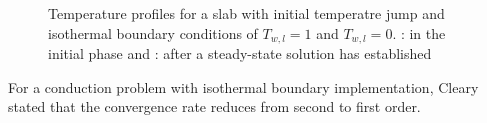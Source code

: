 \documentclass[11pt,a4paper,twoside]{report}
\begin{document}


\begin{figure}[!htbp]
\centering
\label{fig:PureHeat_Isothermal}

\caption[Temperature profiles for slab with isothermal edges]{Temperature profiles for a slab with initial temperatre jump and isothermal boundary conditions of $T_{w,l}=1$ and $T_{w,l}=0$. : in the initial phase and : after a steady-state solution has established}

\end{figure}

For a conduction problem with isothermal boundary implementation, Cleary \cite{Cleary1999} stated that the convergence rate reduces from second to first order. 
\end{document}
